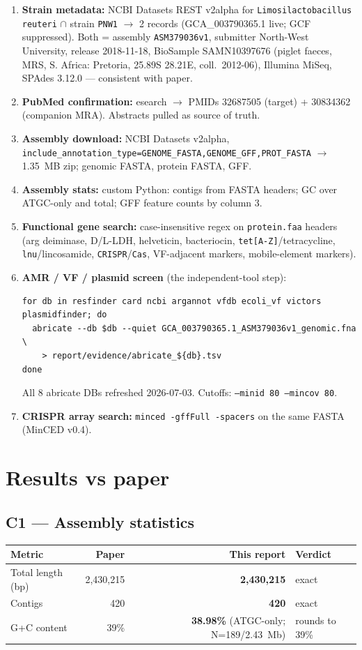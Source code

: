\documentclass[11pt,letterpaper]{article}
\begin{document}
\begin{enumerate}[leftmargin=1.4em]
  \item \textbf{Strain metadata:} NCBI Datasets REST v2alpha for \texttt{Limosilactobacillus reuteri} $\cap$ strain \texttt{PNW1} $\rightarrow$ 2 records (GCA\_003790365.1 live; GCF suppressed). Both = assembly \texttt{ASM379036v1}, submitter North-West University, release 2018-11-18, BioSample SAMN10397676 (piglet faeces, MRS, S. Africa: Pretoria, 25.89S 28.21E, coll.\ 2012-06), Illumina MiSeq, SPAdes 3.12.0 --- consistent with paper.
  \item \textbf{PubMed confirmation:} esearch $\rightarrow$ PMIDs 32687505 (target) + 30834362 (companion MRA). Abstracts pulled as source of truth.
  \item \textbf{Assembly download:} NCBI Datasets v2alpha, \texttt{include\_annotation\_type=GENOME\_FASTA,GENOME\_GFF,PROT\_FASTA} $\rightarrow$ 1.35~MB zip; genomic FASTA, protein FASTA, GFF.
  \item \textbf{Assembly stats:} custom Python: contigs from FASTA headers; GC over ATGC-only and total; GFF feature counts by column 3.
  \item \textbf{Functional gene search:} case-insensitive regex on \texttt{protein.faa} headers (arg deiminase, D/L-LDH, helveticin, bacteriocin, \texttt{tet[A-Z]}/tetracycline, \texttt{lnu}/lincosamide, \texttt{CRISPR}/\texttt{Cas}, VF-adjacent markers, mobile-element markers).
  \item \textbf{AMR / VF / plasmid screen} (the independent-tool step):
\begin{lstlisting}
for db in resfinder card ncbi argannot vfdb ecoli_vf victors plasmidfinder; do
  abricate --db $db --quiet GCA_003790365.1_ASM379036v1_genomic.fna \
    > report/evidence/abricate_${db}.tsv
done
\end{lstlisting}
    All 8 abricate DBs refreshed 2026-07-03. Cutoffs: \texttt{--minid 80 --mincov 80}.
  \item \textbf{CRISPR array search:} \texttt{minced -gffFull -spacers} on the same FASTA (MinCED v0.4).
\end{enumerate}

\section{Results vs paper}

\subsection*{C1 --- Assembly statistics}
\begin{tabular}{lrrl}
\toprule
Metric & Paper & This report & Verdict \\
\midrule
Total length (bp) & 2{,}430{,}215 & \textbf{2{,}430{,}215} & \checkmark exact \\
Contigs & 420 & \textbf{420} & \checkmark exact \\
G+C content & 39\% & \textbf{38.98\%} (ATGC-only; N=189/2.43~Mb) & \checkmark rounds to 39\% \\
\bottomrule
\end{tabular}
\end{document}
